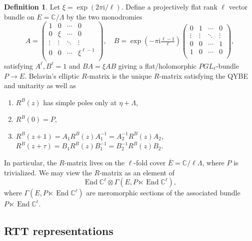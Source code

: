\documentclass[11pt]{report}
\theoremstyle{definition}
\newtheorem{definition}[theorem]{Definition}
\theoremstyle{remark}
\theoremstyle{remark}
\newcommand{\C}{\mathbb{C}}
\newcommand{\I}{\mathrm{i}}
\begin{document}
\cite{article:etingof:1998}

\begin{definition}
Let $\xi = \exp(2\pi\I/\ell)$. Define a projectively flat rank $\ell$ vector bundle on $E = \C/\Lambda$ by the two monodromies
\begin{equation*}
A =
\begin{pmatrix}
1 & 0 & \cdots & 0 \\
0 & \xi & \cdots & 0 \\
\vdots & \vdots & \ddots & \vdots \\
0 & 0 & \cdots & \xi^{\ell-1} \\
\end{pmatrix}
,\quad
B = \exp(-\pi\I \tfrac{\ell-1}{\ell})
\begin{pmatrix}
0 & 1 & \cdots & 0 \\
\vdots & \vdots & \ddots & \vdots \\
0 & 0 & \cdots & 1 \\
1 & 0 & \cdots & 0 \\
\end{pmatrix},
\end{equation*}
satisfying $A^\ell,B^\ell = 1$ and $BA = \xi AB$ giving a flat/holomorphic $PGL_\ell$-bundle $P \to E$. Belavin's elliptic $R$-matrix is the unique $R$-matrix satisfying the QYBE and unitarity as well as
\begin{enumerate}[label=(\roman*)]
\item $R^B(z)$ has simple poles only at $\eta + \Lambda$,
\item $R^B(0) = P$,
\item $R^B(z+1) = A_1 R^B(z) A_1^{-1} = A_2^{-1} R^B(z) A_2$, $R^B(z+\tau) = B_1 R^B(z) B_1^{-1} = B_2^{-1} R^B(z) B_2$.
\end{enumerate}
In particular, the $R$-matrix lives on the $\ell$-fold cover $\bar E = \C/\ell \Lambda$, where $P$ is trivialized. We may view the $R$-matrix as an element of
\begin{equation*}
\operatorname{End} \C^\ell \otimes \Gamma(E,P \ltimes \operatorname{End} \C^\ell),
\end{equation*}
where $\Gamma(E,P \ltimes \operatorname{End} \C^\ell)$ are meromorphic sections of the associated bundle $P \ltimes \operatorname{End} \C^\ell$.
\end{definition}

\subsection{RTT representations}
\end{document}
